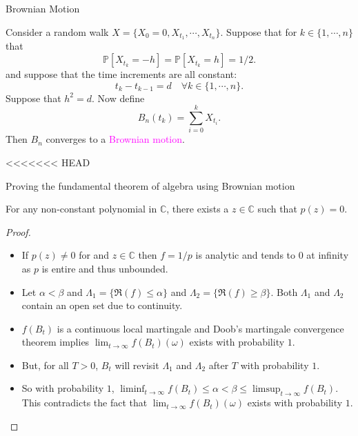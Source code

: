 \documentclass{beamer}%
\numberwithin{equation}{section}
\begin{document}
\begin{frame}{Brownian Motion}

	\begin{Theorem}
		Consider a random walk $X = \{X_{0}=0, X_{t_1}, \cdots, X_{t_n}\}$. Suppose that for $k \in \{1, \cdots ,n\}$ that
		\[
		\mathbb{P}\left[ X_{t_k} = -h \right] = \mathbb{P}\left[ X_{t_k} = h \right] = 1/2.
		\]
		and suppose that the time increments are all constant:
		\[
		t_k-t_{k-1} = d \quad \forall k \in \{ 1, \cdots, n \}.
		\]
		Suppose that $h^2 = d$. Now define
		\[
		B_n(t_{k}) = \sum_{i=0}^k X_{t_i}.
		\]
    Then $B_n$ converges to a \textcolor{magenta}{Brownian motion}.
	\end{Theorem}
\end{frame}

<<<<<<< HEAD
\begin{frame}[t]{Proving the fundamental theorem of algebra using Brownian motion} 
	\begin{theorem}
		For any non-constant polynomial in $\mathbb{C}$, there exists a $z \in \mathbb{C}$ such that $p(z) = 0$.
	\end{theorem}
\begin{proof}
	\begin{itemize}
		\item If $p(z) \not = 0$ for and $z \in \mathbb{C}$ then $f = 1/p$ is analytic and tends to $0$ at infinity as $p$ is entire and thus unbounded.
		\item Let $\alpha < \beta$ and $\Lambda_1 = \{ \Re(f) \le \alpha\}$ and $\Lambda_2 = \{ \Re(f) \ge \beta \}$. Both $\Lambda_1$ and $\Lambda_2$ contain an open set due to continuity.
		\item $f(B_t)$ is a continuous local martingale and Doob's martingale convergence theorem implies $\lim_{t \to \infty }f(B_t)(\omega)$ exists with probability $1$.
		\item But, for all $T>0$, $B_t$ will revisit $\Lambda_1$ and $\Lambda_2$ after $T$ with probability $1$.
		\item So with probability $1$, $\liminf_{t \to \infty} f(B_t) \le \alpha < \beta \le \limsup_{t \to \infty} f(B_t)$. This contradicts the fact that $\lim_{t \to \infty }f(B_t)(\omega)$ exists with probability $1$.
	\end{itemize} 
\end{proof}
\end{frame}
\end{document}
